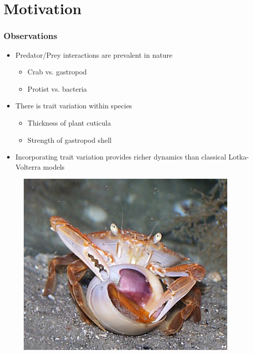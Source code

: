 \documentclass[10pt]{beamer}
\begin{document}
\section{Motivation}
\begin{frame}
	\frametitle{Observations}
	\footnotesize{
\begin{minipage}{0.65\textwidth}
	\begin{itemize}
		\item Predator/Prey interactions are prevalent in nature
		\begin{itemize}
			\item \footnotesize{Crab vs. gastropod}
			\item Protist vs. bacteria
		\end{itemize}
		\item There is trait variation within species
		\begin{itemize}
			\item Thickness of plant cuticula
			\item Strength of gastropod shell
		\end{itemize}
		\item Incorporating trait variation provides richer dynamics than classical Lotka-Volterra models
	\end{itemize}
	\end{minipage}
	\begin{minipage}{0.25\textwidth}
	\begin{figure}
	\includegraphics[width=0.95\textwidth]{figures/crab_eating_gastropod.jpg}
	\end{figure}
	\end{minipage}
	
	}
\end{frame}
\end{document}
